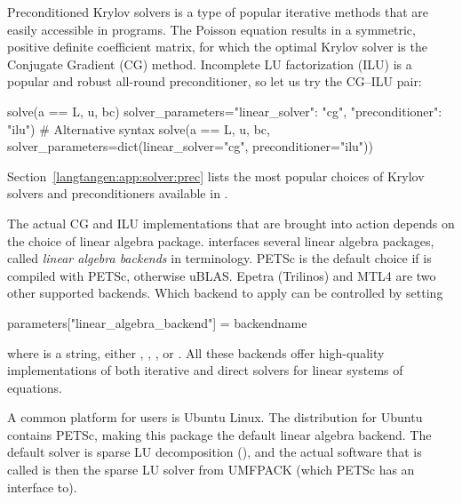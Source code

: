 Preconditioned Krylov solvers is a type of popular iterative methods that are
easily accessible in \fenics{} programs. The Poisson equation results in
a symmetric, positive definite coefficient matrix, for which the optimal
Krylov solver is the Conjugate Gradient (CG) method. Incomplete
LU factorization (ILU) is a popular and
robust all-round preconditioner, so let us try the CG--ILU pair:
\begin{python}
solve(a == L, u, bc)
      solver_parameters={"linear_solver": "cg",
                         "preconditioner": "ilu"})
# Alternative syntax
solve(a == L, u, bc,
      solver_parameters=dict(linear_solver="cg",
                             preconditioner="ilu"))
\end{python}
Section~\ref{langtangen:app:solver:prec} lists the most
popular choices of Krylov solvers and preconditioners available in
\fenics.

The actual CG and ILU implementations that are brought into action depends on
the choice of linear algebra package. \fenics{} interfaces
several linear algebra packages, called \emph{linear algebra backends}
in \fenics{} terminology.
PETSc is the default choice if \dolfin{} is compiled with PETSc,
otherwise uBLAS.  Epetra (Trilinos) and MTL4 are two other
supported backends.
Which backend to apply can
be controlled by setting
\begin{python}
parameters["linear_algebra_backend"] = backendname
\end{python}
where  is a string, either , ,
, or .  All these backends offer high-quality
implementations of both iterative and direct solvers for linear systems
of equations.

A common platform for \fenics{} users is Ubuntu Linux.  The \fenics{}
distribution for Ubuntu contains PETSc, making this package the default
linear algebra backend.  The default solver is sparse LU decomposition
(), and the actual software that is called
is then the sparse LU solver from UMFPACK (which PETSc has an
interface to).

